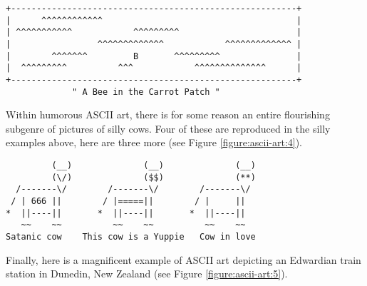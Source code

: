 \begin{figure*}
    \begin{shaded}
        \begin{verbatim}
+--------------------------------------------------------+
|      ^^^^^^^^^^^^                                      |
| ^^^^^^^^^^^            ^^^^^^^^^                       |
|                 ^^^^^^^^^^^^^            ^^^^^^^^^^^^^ |
|        ^^^^^^^         B       ^^^^^^^^^               |
|  ^^^^^^^^^          ^^^            ^^^^^^^^^^^^^^      |
+--------------------------------------------------------+
             " A Bee in the Carrot Patch "\end{verbatim}
    \end{shaded}
    \caption{Another silly ASCII art example}
    \label{figure:ascii-art:3}
\end{figure*}

Within humorous ASCII art, there is for some reason an entire flourishing
subgenre of pictures of silly cows. Four of these are reproduced in the silly
examples above, here are three more (see Figure \ref{figure:ascii-art:4}).

\begin{figure*}
    \begin{shaded}
        \begin{verbatim}
         (__)              (__)              (__)
         (\/)              ($$)              (**)
  /-------\/        /-------\/        /-------\/
 / | 666 ||        / |=====||        / |     ||
*  ||----||       *  ||----||       *  ||----||
   ~~    ~~          ~~    ~~          ~~    ~~
Satanic cow    This cow is a Yuppie   Cow in love\end{verbatim}
    \end{shaded}
    \caption{Yet another silly ASCII art example}
    \label{figure:ascii-art:4}
\end{figure*}

Finally, here is a magnificent example of ASCII art depicting an Edwardian train
station in Dunedin, New Zealand (see Figure \ref{figure:ascii-art:5}).

